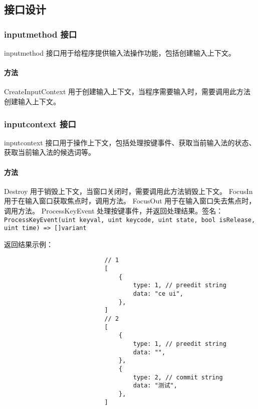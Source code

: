 \documentclass{utart}
\begin{document}
    \subsection{接口设计}

        \subsubsection{inputmethod 接口}
            \par inputmethod 接口用于给程序提供输入法操作功能，包括创建输入上下文。
            \paragraph{方法}
                \begin{outline}[enumerate]
                    \1 CreateInputContext 用于创建输入上下文，当程序需要输入时，需要调用此方法创建输入上下文。
                \end{outline}

        \subsubsection{inputcontext 接口}
            \par inputcontext 接口用于操作上下文，包括处理按键事件、获取当前输入法的状态、获取当前输入法的候选词等。
            \paragraph{方法}
                \begin{outline}[enumerate]
                    \1 Destroy 用于销毁上下文，当窗口关闭时，需要调用此方法销毁上下文。
                    \1 FocusIn 用于在输入窗口获取焦点时，调用方法。
                    \1 FocusOut 用于在输入窗口失去焦点时，调用方法。
                    \1 ProcessKeyEvent 处理按键事件，并返回处理结果。签名：\texttt{ProcessKeyEvent(uint keyval, uint keycode, uint state, bool isRelease, uint time) => []variant}
                        \par 返回结果示例：
                        \begin{verbatim}
                            // 1
                            [
                                {
                                    type: 1, // preedit string
                                    data: "ce ui",
                                },
                            ]
                            // 2
                            [
                                {
                                    type: 1, // preedit string
                                    data: "",
                                },
                                {
                                    type: 2, // commit string
                                    data: "测试",
                                },
                            ]
                        \end{verbatim}
                \end{outline}

\end{document}
